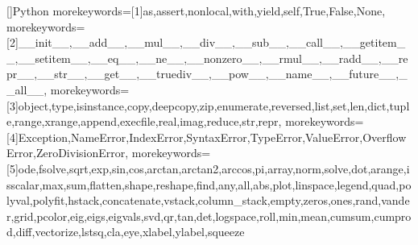 




[]{Python}{
    morekeywords=[1]{as,assert,nonlocal,with,yield,self,True,False,None},
    morekeywords=[2]{__init__,__add__,__mul__,__div__,__sub__,__call__,__getitem__,__setitem__,__eq__,__ne__,__nonzero__,__rmul__,__radd__,__repr__,__str__,__get__,__truediv__,__pow__,__name__,__future__,__all__},
    morekeywords=[3]{object,type,isinstance,copy,deepcopy,zip,enumerate,reversed,list,set,len,dict,tuple,range,xrange,append,execfile,real,imag,reduce,str,repr},
    morekeywords=[4]{Exception,NameError,IndexError,SyntaxError,TypeError,ValueError,OverflowError,ZeroDivisionError},
    morekeywords=[5]{ode,fsolve,sqrt,exp,sin,cos,arctan,arctan2,arccos,pi,array,norm,solve,dot,arange,isscalar,max,sum,flatten,shape,reshape,find,any,all,abs,plot,linspace,legend,quad,polyval,polyfit,hstack,concatenate,vstack,column_stack,empty,zeros,ones,rand,vander,grid,pcolor,eig,eigs,eigvals,svd,qr,tan,det,logspace,roll,min,mean,cumsum,cumprod,diff,vectorize,lstsq,cla,eye,xlabel,ylabel,squeeze}
}


